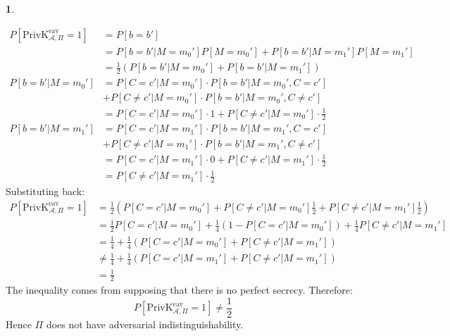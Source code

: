 \documentclass{article}
\theoremstyle{definition}
\newcommand{\priveav}{\text{PrivK}_{\mathcal{A},\Pi}^\text{eav}}
\theoremstyle{definition}
\theoremstyle{definition}
\newtheorem{solution-internal}{}[subsection]
\newenvironment{solution}{
  \begin{solution-internal}
}{
  \end{solution-internal}
}
\begin{document}
\begin{solution}
\begin{item}
      \begin{align*}
        P[\priveav = 1] &= P[b=b']\\
                        &= P[b=b'|M=m_0']P[M=m_0'] + P[b=b'|M=m_1']P[M=m_1'] \\
                        &= \frac{1}{2}\left(P[b=b'|M=m_0'] + P[b=b'|M=m_1'] \right) \\
        P[b=b'|M=m_0'] &= P[C=c'|M=m_0']\cdot P[b=b'|M=m_0',C=c']\\
                       &+ P[C\neq c'|M=m_0']\cdot P[b=b'|M=m_0', C\neq c'] \\
        &= P[C=c'|M=m_0']\cdot 1 + P[C\neq c'|M=m_0']\cdot \frac{1}{2} \\
        P[b=b'|M=m_1'] &= P[C=c'|M=m_1']\cdot P[b=b'|M=m_1',C=c']\\
                       &+ P[C\neq c'|M=m_1']\cdot P[b=b'|M=m_1', C\neq c'] \\
        &= P[C=c'|M=m_1']\cdot 0 + P[C\neq c'|M=m_1']\cdot \frac{1}{2} \\
        &= P[C\neq c'|M=m_1']\cdot \frac{1}{2}
      \end{align*}
    Substituting back:
      \begin{align*}
        P[\priveav = 1] &= \frac{1}{2}\left( P[C=c'|M=m_0'] + P[C\neq c'|M=m_0'] \frac{1}{2} + P[C\neq c'|M=m_1'] \frac{1}{2}\right )  \\
                        &= \frac{1}{2} P[C=c'|M=m_0'] + \frac{1}{4}\left(1 - P[C
      = c'|M=m_0']\right) + \frac{1}{4} P[C\neq c'|M=m_1'] \\
                        &= \frac{1}{4} + \frac{1}{4}\left(P[C=c'|M=m_0'] +  P[C\neq c'|M=m_1'] \right) \\
                        &\neq \frac{1}{4} + \frac{1}{4}\left(P[C=c'|M=m_1'] +  P[C\neq c'|M=m_1'] \right) \\
                        &=\frac{1}{2}
      \end{align*}
      The inequality comes from supposing that there is no perfect secrecy.
      Therefore:
      \[ P[\priveav = 1] \neq \frac{1}{2} \]
      Hence $\Pi$ does not have adversarial indistinguishability.
  \end{item}
\end{solution}
\end{document}
